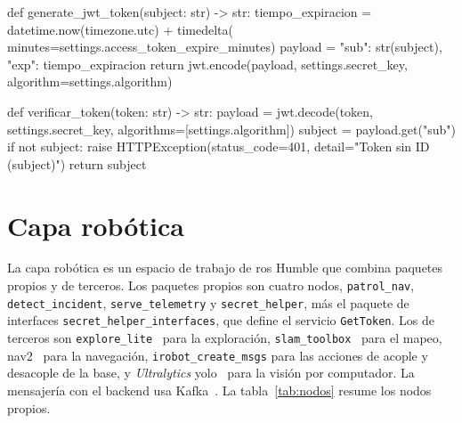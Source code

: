 %
\begin{pythoncode}[title={Generación y verificación de JWT (security.py)}, label={lst:jwt}]
def generate_jwt_token(subject: str) -> str:
    tiempo_expiracion = datetime.now(timezone.utc) + timedelta(
        minutes=settings.access_token_expire_minutes)
    payload = {"sub": str(subject), "exp": tiempo_expiracion}
    return jwt.encode(payload, settings.secret_key,
                      algorithm=settings.algorithm)

def verificar_token(token: str) -> str:
    payload = jwt.decode(token, settings.secret_key,
                         algorithms=[settings.algorithm])
    subject = payload.get("sub")
    if not subject:
        raise HTTPException(status_code=401, detail="Token sin ID (subject)")
    return subject
\end{pythoncode}%

\section{Capa robótica}
\label{sec:capa-robotica}

La capa robótica es un espacio de trabajo de \gls{ros} Humble que combina
paquetes propios y de terceros. Los paquetes propios son cuatro nodos,
\texttt{patrol\_nav}, \texttt{detect\_incident}, \texttt{serve\_telemetry} y
\texttt{secret\_helper}, más el paquete de interfaces
\texttt{secret\_helper\_interfaces}, que define el servicio \texttt{GetToken}. Los
de terceros son \texttt{explore\_lite}~\parencite{alvarez2022mexplore} para la
exploración, \texttt{slam\_toolbox}~\parencite{macenski2021slamtoolbox} para el mapeo,
\gls{nav2}~\parencite{macenski2020nav2} para la navegación,
\texttt{irobot\_create\_msgs} para las acciones de acople y desacople de la base, y
\textit{Ultralytics}
\gls{yolo}~\parencite{jocher2023ultralytics,redmon2016yolo} para la visión por
computador. La mensajería con el backend usa Kafka~\parencite{kreps2011kafka}. La
tabla~\ref{tab:nodos} resume los nodos propios.

